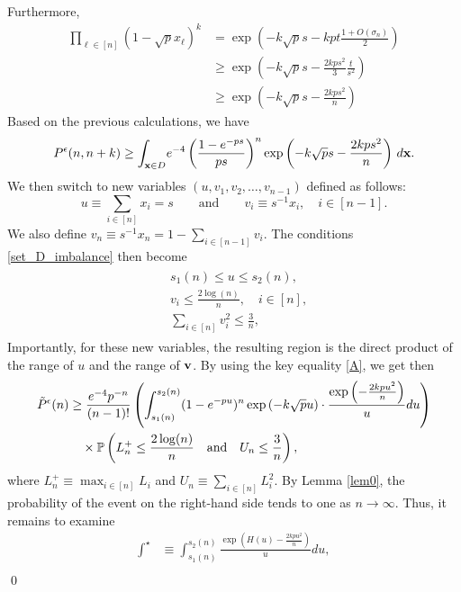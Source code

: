 \documentclass[10pt,a4paper]{amsart}
\newcommand{\Prob}{\operatorname{\Bbb{P}}}
\newenvironment{proof}{\noindent{\bf Proof:}}{\qed}
\begin{document}
\begin{proof}
Furthermore,
\begin{align*}
    \prod_{\ell\in [n]}(1-\sqrt{p}x_{\ell})^k 
    &= \exp\left(-k\sqrt{p}s-kpt\frac{1+O\left(\sigma_n\right)}{2}\right)\\
    &\geq \exp\left(-k\sqrt{p}s-\frac{2kps^2}{3}\frac{t}{s^2}\right)\\
    &\geq \exp\left(-k\sqrt{p}s-\frac{2kps^2}{n}\right)
\end{align*}
Based on the previous calculations, we have
\begin{align*}
P^\epsilon(n,n+k)\geq \int_{\bold x \in D}\!e^{-4} \left(\frac{1 - e^{-ps}}{ps} \right)^n \exp\left(-k\sqrt{p}s-\frac{2kps^2}{n}\right)\,d\bold x.
\end{align*}
We then switch to new variables $(u,v_1,v_2,\ldots,v_{n-1})$ defined as follows:
\begin{equation*}
    u \equiv \sum_{i \in [n]} x_i = s \qquad \text{and} \qquad v_i \equiv
    s^{-1}x_i, \quad i \in [n-1].
\end{equation*}
We also define $v_n \equiv s^{-1}x_n=1-\sum_{i \in [n-1]}v_i$. The conditions \eqref{set_D_imbalance} then become
\begin{align}
\begin{split}
&s_1(n)  \leq u \leq s_2(n), \\
&v_i \leq \frac{2\log(n)}{n},\quad i \in [n],\\
&\sum_{i \in [n]}v_i^2\leq \frac{3}{n},
\end{split}
\end{align}
Importantly, for these new variables, the resulting region is the direct product of the range of $u$ and the range of $\bold v$. By using the key equality \eqref{A},  we get then
\begin{align*}
\tilde{P}^\epsilon(n)& \geq \frac{e^{-4}p^{-n}}{(n-1)!} \left( \int_{s_1(n)}^{s_2(n)} (1 - e^{-pu})^n \exp\left(-k\sqrt{p}u\right)\cdot \frac{\exp\left(-\frac{2kpu^2}{n}\right)}{u} du \right)\\
&\quad\times \Prob\left(L^+_n  \leq \frac{2\log(n)}{n} \quad \text{and} \quad U_n \leq \frac{3}{n}\right),
\end{align*}
where $L^+_n \equiv  \max_{i \in [n]} L_i$ and $U_n \equiv \sum_{i \in [n]}L_i^2$. By Lemma \ref{lem0},  the probability of the event on the right-hand side tends to one as $n \to \infty$. Thus, it remains to examine
\begin{equation}\label{int*} 
\begin{aligned}
\int^\star& \equiv \int_{s_1(n)}^{s_2(n)}  \frac{\exp\left(H(u)-\frac{2kpu^2}{n}\right)}{u} du,\\

\end{aligned}
\end{equation}
\end{proof}
\end{document}
